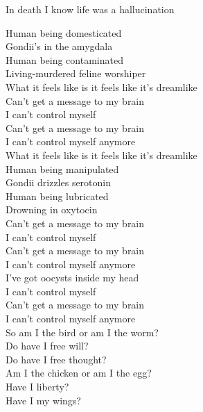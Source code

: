 In death I know life was a hallucination \\




Human being domesticated \\
Gondii's in the amygdala \\
Human being contaminated \\
Living-murdered feline worshiper \\

What it feels like is it feels like it's dreamlike \\

Can't get a message to my brain \\
I can't control myself \\
Can't get a message to my brain \\
I can't control myself anymore \\

What it feels like is it feels like it's dreamlike \\

Human being manipulated \\
Gondii drizzles serotonin \\
Human being lubricated \\
Drowning in oxytocin \\

Can't get a message to my brain \\
I can't control myself \\
Can't get a message to my brain \\
I can't control myself anymore \\
I've got oocysts inside my head \\
I can't control myself \\
Can't get a message to my brain \\
I can't control myself anymore \\

So am I the bird or am I the worm? \\
Do have I free will? \\
Do have I free thought? \\

Am I the chicken or am I the egg? \\
Have I liberty? \\
Have I my wings? \\

